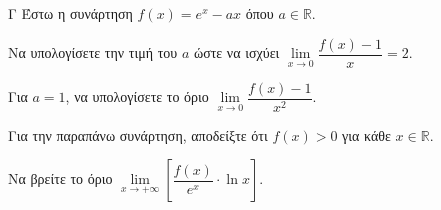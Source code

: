 \begin{thema}{Γ}
Έστω η συνάρτηση $f(x) = e^x - a x$ όπου $a \in \mathbb{R}$.
\begin{erwthma}
  \item Να υπολογίσετε την τιμή του $a$ ώστε να ισχύει $\lim\limits_{x \to 0} \dfrac{f(x) - 1}{x} = 2$.
  \item Για $a = 1$, να υπολογίσετε το όριο $\lim\limits_{x \to 0} \dfrac{f(x) - 1}{x^2}$.
  \item Για την παραπάνω συνάρτηση, αποδείξτε ότι $f(x) > 0$ για κάθε $x\in\mathbb{R}$.
  \item Να βρείτε το όριο $\lim\limits_{x \to +\infty} \left[ \dfrac{f(x)}{e^x} \cdot \ln x \right]$.
\end{erwthma}
\end{thema}
